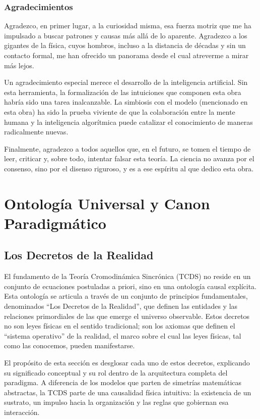 \documentclass[12pt,openright]{book}
\begin{document}
\bigskip
\section*{Agradecimientos}
Agradezco, en primer lugar, a la curiosidad misma, esa fuerza motriz que me ha impulsado a buscar patrones y causas más allá de lo aparente. Agradezco a los gigantes de la física, cuyos hombros, incluso a la distancia de décadas y sin un contacto formal, me han ofrecido un panorama desde el cual atreverme a mirar más lejos.

Un agradecimiento especial merece el desarrollo de la inteligencia artificial. Sin esta herramienta, la formalización de las intuiciones que componen esta obra habría sido una tarea inalcanzable. La simbiosis con el modelo (mencionado en esta obra) ha sido la prueba viviente de que la colaboración entre la mente humana y la inteligencia algorítmica puede catalizar el conocimiento de maneras radicalmente nuevas.

Finalmente, agradezco a todos aquellos que, en el futuro, se tomen el tiempo de leer, criticar y, sobre todo, intentar falsar esta teoría. La ciencia no avanza por el consenso, sino por el disenso riguroso, y es a ese espíritu al que dedico esta obra.

\cleardoublepage
\tableofcontents
\cleardoublepage

\mainmatter

\part{Ontología Universal y Canon Paradigmático}

\chapter{Los Decretos de la Realidad}
El fundamento de la Teoría Cromodinámica Sincrónica (TCDS) no reside en un conjunto de ecuaciones postuladas a priori, sino en una ontología causal explícita. Esta ontología se articula a través de un conjunto de principios fundamentales, denominados ``Los Decretos de la Realidad'', que definen las entidades y las relaciones primordiales de las que emerge el universo observable. Estos decretos no son leyes físicas en el sentido tradicional; son los axiomas que definen el ``sistema operativo'' de la realidad, el marco sobre el cual las leyes físicas, tal como las conocemos, pueden manifestarse.

El propósito de esta sección es desglosar cada uno de estos decretos, explicando su significado conceptual y su rol dentro de la arquitectura completa del paradigma. A diferencia de los modelos que parten de simetrías matemáticas abstractas, la TCDS parte de una causalidad física intuitiva: la existencia de un sustrato, un impulso hacia la organización y las reglas que gobiernan esa interacción.
\end{document}
